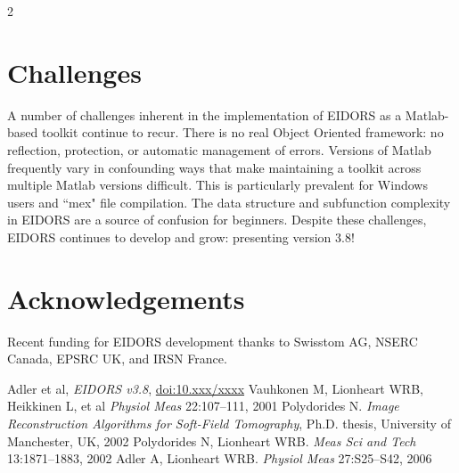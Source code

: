 \documentclass[10pt,a4paper]{article}
\renewenvironment{thebibliography}[1]{%
    \begin{oldthebibliography}{#1}%
      \setlength{\parskip}{0ex}%
      \setlength{\itemsep}{0ex}%
  }%
  {%
    \end{oldthebibliography}%
  }
\begin{document}
\begin{multicols}{2}
\section{Challenges}
A number of challenges inherent in the implementation of EIDORS as a Matlab-based toolkit continue to recur.
There is no real Object Oriented framework: no reflection, protection, or
  automatic management of errors.
Versions of Matlab frequently vary in confounding ways that make
  maintaining a toolkit across multiple Matlab versions difficult. This is
  particularly prevalent for Windows users and ``mex" file compilation.
The data structure and subfunction complexity in EIDORS are a
  source of confusion for beginners.
Despite these challenges, EIDORS continues to develop and grow: presenting version 3.8!

\section*{Acknowledgements}
Recent funding for EIDORS development thanks to
Swisstom AG, NSERC Canada, EPSRC UK, and IRSN France.

\footnotesize
\begin{thebibliography}{}
   Adler et al, {\em EIDORS v3.8},
       \href{http://dx.doi.org/10.xxxx/xxxxxxxxx}{doi:10.xxx/xxxx}
   Vauhkonen M, Lionheart WRB, Heikkinen L, et al
   {\em  Physiol Meas} 22:107--111, 2001
   Polydorides N.
 {\em Image Reconstruction Algorithms for Soft-Field Tomography}, Ph.D. thesis, University of Manchester, UK, 2002
   Polydorides N, Lionheart WRB.
   {\em Meas Sci and Tech} 13:1871--1883, 2002
Adler A, Lionheart WRB. {\em Physiol Meas} 27:S25--S42, 2006
\end{thebibliography}
\end{multicols}
\end{document}
